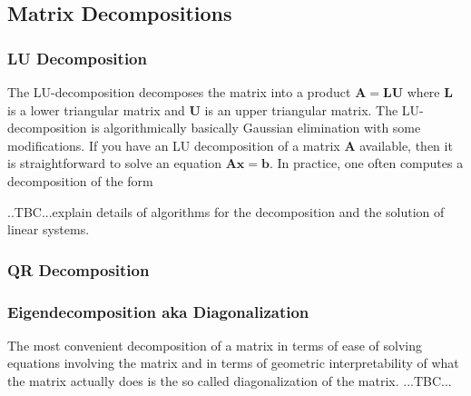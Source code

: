 



\subsection{Matrix Decompositions}

\subsubsection{LU Decomposition}
The LU-decomposition decomposes the matrix into a product $\mathbf{A = L U}$ where $\mathbf{L}$ is a lower triangular matrix and $\mathbf{U}$ is an upper triangular matrix. The LU-decomposition is algorithmically basically Gaussian elimination with some modifications. If you have an LU decomposition of a matrix $\mathbf{A}$ available, then it is straightforward to solve an equation $\mathbf{Ax = b}$. In practice, one often computes a decomposition of the form 

..TBC...explain details of algorithms for the decomposition and the solution of linear systems.


\subsubsection{QR Decomposition}


\subsubsection{Eigendecomposition aka Diagonalization}
The most convenient decomposition of a matrix in terms of ease of solving equations involving the matrix and in terms of geometric interpretability of what the matrix actually does is the so called diagonalization of the matrix. ...TBC...

